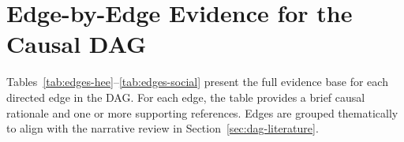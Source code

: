 
\section{Edge-by-Edge Evidence for the Causal DAG}\label{app:edge-table}

Tables~\ref{tab:edges-hee}--\ref{tab:edges-social} present the full evidence base for each directed edge in the DAG. For each edge, the table provides a brief causal rationale and one or more supporting references. Edges are grouped thematically to align with the narrative review in Section~\ref{sec:dag-literature}.


